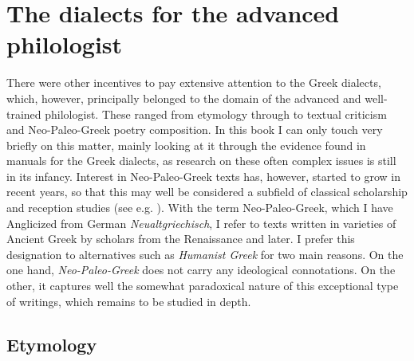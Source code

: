 \section{The dialects for the advanced philologist}\label{sec:3.2}

There were other incentives to pay extensive attention to the Greek dialects, which, however, principally belonged to the domain of the advanced and well-trained philologist. These ranged from etymology through to textual criticism and Neo-Paleo-Greek poetry composition. In this book I can only touch very briefly on this matter, mainly looking at it through the evidence found in manuals for the Greek dialects, as research on these often complex issues is still in its infancy. Interest in Neo-Paleo-Greek texts has, however, started to grow in recent years, so that this may well be considered a subfield of classical scholarship and reception studies (see e.g. \citealt{Pall2018}). With the term Neo-Paleo-Greek, which I have Anglicized from German \textit{Neualtgriechisch}, I refer to texts written in varieties of Ancient Greek by scholars from the Renaissance and later. I prefer this designation to alternatives such as \textit{Humanist Greek} for two main reasons. On the one hand, \textit{Neo-Paleo-Greek} does not carry any ideological connotations. On the other, it captures well the somewhat paradoxical nature of this exceptional type of writings, which remains to be studied in depth.

\subsection{Etymology}

